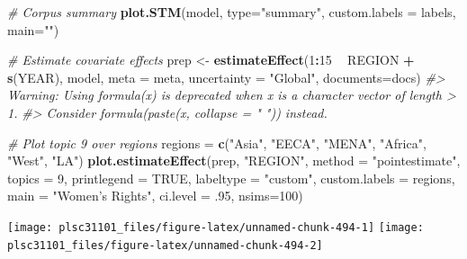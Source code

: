 \documentclass[
]{book}
\newenvironment{Shaded}{\begin{snugshade}}{\end{snugshade}}
\newcommand{\CommentTok}[1]{\textcolor[rgb]{0.56,0.35,0.01}{\textit{#1}}}
\newcommand{\DataTypeTok}[1]{\textcolor[rgb]{0.13,0.29,0.53}{#1}}
\newcommand{\DecValTok}[1]{\textcolor[rgb]{0.00,0.00,0.81}{#1}}
\newcommand{\FloatTok}[1]{\textcolor[rgb]{0.00,0.00,0.81}{#1}}
\newcommand{\KeywordTok}[1]{\textcolor[rgb]{0.13,0.29,0.53}{\textbf{#1}}}
\newcommand{\NormalTok}[1]{#1}
\newcommand{\OperatorTok}[1]{\textcolor[rgb]{0.81,0.36,0.00}{\textbf{#1}}}
\newcommand{\OtherTok}[1]{\textcolor[rgb]{0.56,0.35,0.01}{#1}}
\newcommand{\StringTok}[1]{\textcolor[rgb]{0.31,0.60,0.02}{#1}}
\begin{document}
\begin{Shaded}
\begin{Highlighting}[]
\CommentTok{# Corpus summary}
\KeywordTok{plot.STM}\NormalTok{(model, }\DataTypeTok{type=}\StringTok{"summary"}\NormalTok{, }\DataTypeTok{custom.labels =}\NormalTok{ labels, }\DataTypeTok{main=}\StringTok{""}\NormalTok{)}

\CommentTok{# Estimate covariate effects}
\NormalTok{prep <-}\StringTok{ }\KeywordTok{estimateEffect}\NormalTok{(}\DecValTok{1}\OperatorTok{:}\DecValTok{15} \OperatorTok{~}\StringTok{ }\NormalTok{REGION }\OperatorTok{+}\StringTok{ }\KeywordTok{s}\NormalTok{(YEAR), model, }\DataTypeTok{meta =}\NormalTok{ meta, }\DataTypeTok{uncertainty =} \StringTok{"Global"}\NormalTok{, }\DataTypeTok{documents=}\NormalTok{docs)}
\CommentTok{#> Warning: Using formula(x) is deprecated when x is a character vector of length > 1.}
\CommentTok{#>   Consider formula(paste(x, collapse = " ")) instead.}

\CommentTok{# Plot topic 9 over regions}
\NormalTok{regions =}\StringTok{ }\KeywordTok{c}\NormalTok{(}\StringTok{"Asia"}\NormalTok{, }\StringTok{"EECA"}\NormalTok{, }\StringTok{"MENA"}\NormalTok{, }\StringTok{"Africa"}\NormalTok{, }\StringTok{"West"}\NormalTok{, }\StringTok{"LA"}\NormalTok{)}
\KeywordTok{plot.estimateEffect}\NormalTok{(prep, }\StringTok{"REGION"}\NormalTok{, }\DataTypeTok{method =} \StringTok{"pointestimate"}\NormalTok{, }\DataTypeTok{topics =} \DecValTok{9}\NormalTok{, }\DataTypeTok{printlegend =} \OtherTok{TRUE}\NormalTok{, }\DataTypeTok{labeltype =} \StringTok{"custom"}\NormalTok{, }\DataTypeTok{custom.labels =}\NormalTok{ regions, }\DataTypeTok{main =} \StringTok{"Women's Rights"}\NormalTok{, }\DataTypeTok{ci.level =} \FloatTok{.95}\NormalTok{, }\DataTypeTok{nsims=}\DecValTok{100}\NormalTok{)}
\end{Highlighting}
\end{Shaded}

\begin{center}\texttt{[image: plsc31101\_files/figure-latex/unnamed-chunk-494-1]} \texttt{[image: plsc31101\_files/figure-latex/unnamed-chunk-494-2]} \end{center}
\end{document}
